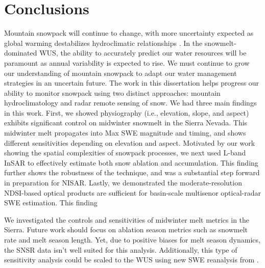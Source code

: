 
\hypertarget{ch5}{\chapter{Conclusions}\label{ch5}}

Mountain snowpack will continue to change, with more uncertainty expected as global warming destabilizes hydroclimatic relationships \citep{millyStationarityDeadWhither2008}. In the snowmelt-dominated WUS, the ability to accurately predict our water resources will be paramount as annual variability is expected to rise. We must continue to grow our understanding of mountain snowpack to adapt our water management strategies in an uncertain future. The work in this dissertation helps progress our ability to monitor snowpack using two distinct approaches: mountain hydroclimatology and radar remote sensing of snow. We had three main findings in this work. First, we showed physiography (i.e., elevation, slope, and aspect) exhibits significant control on midwinter snowmelt in the Sierra Nevada. This midwinter melt propagates into Max SWE magnitude and timing, and shows different sensitivities depending on elevation and aspect. Motivated by our work showing the spatial complexities of snowpack processes, we next used L-band InSAR to effectively estimate both snow ablation and accumulation. This finding further shows the robustness of the technique, and was a substantial step forward in preparation for NISAR. Lastly, we demonstrated the moderate-resolution NDSI-based optical products are sufficient for basin-scale multisenor optical-radar SWE estimation. This finding 



We investigated the controls and sensitivities of midwinter melt metrics in the Sierra. Future work should focus on ablation season metrics such as snowmelt rate and melt season length. Yet, due to positive biases for melt season dynamics, the SNSR data isn't well suited for this analysis. Additionally, this type of sensitivity analysis could be scaled to the WUS using new SWE reanalysis from \citep{fangWesternUnitedStates2022}.







